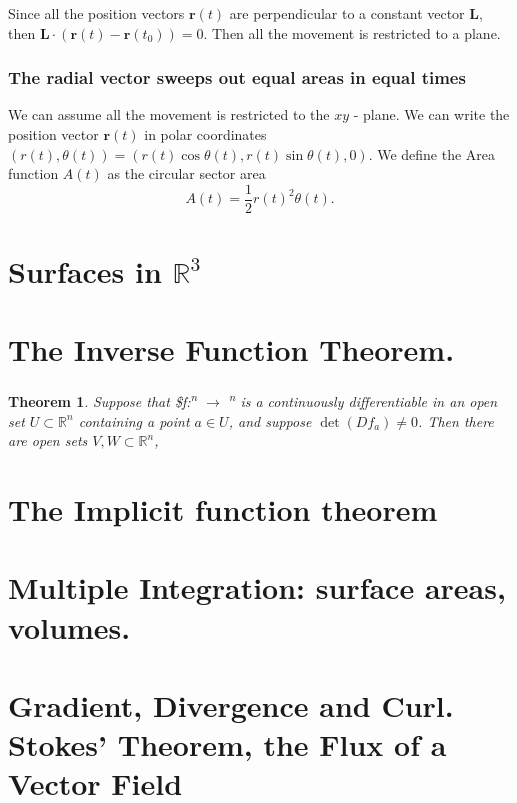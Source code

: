\documentclass{amsart}
\newtheorem{thm}{Theorem}
\begin{document}
Since all the position vectors \(\mathbf{r}(t)\) are perpendicular to a constant vector \(\mathbf{L}\), then  \(\mathbf{L}\cdot \left(\mathbf{r}(t) - \mathbf{r}(t_0)\right) = 0\). Then all the movement is restricted to a plane.


\subsubsection{The radial vector sweeps out equal areas in equal times}
\label{sec:org8572833}

We can assume all the movement is restricted to the \(xy\) - plane. We can write the position vector \(\mathbf{r}(t)\) in polar coordinates \((r(t), \theta(t)) = (r(t)\cos\theta(t), r(t)\sin\theta(t), 0)\). We define the Area function \(A(t)\) as the circular sector area
\[ A(t) = \frac{1}{2} r(t)^2 \theta(t) .\]

\section{Surfaces in \(\mathbb{R}^3\)}
\label{sec:orgc6138ad}

\section{The Inverse Function Theorem.}
\label{sec:org04d7c0d}
\begin{thm}
Suppose that \$f:\textsuperscript{n} \(\to\) \textsuperscript{n} is a continuously differentiable in an open set \(U\subset \mathbb{R}^n\) containing a point \(a\in U\), and suppose \(\det(Df_a) \neq 0\). Then there are open sets \(V,W\subset\mathbb{R}^n\), 
\end{thm}

\section{The Implicit function theorem}
\label{sec:orge6791e8}


\section{Multiple Integration: surface areas, volumes.}
\label{sec:org62023e9}

\section{Gradient, Divergence and Curl. Stokes’ Theorem, the Flux of a Vector Field}
\label{sec:org01a4e37}
\end{document}
